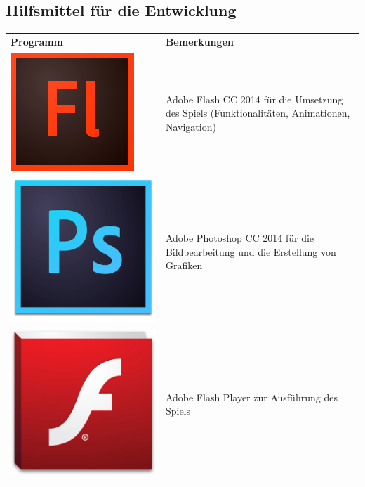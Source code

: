 \documentclass[a4paper, 11pt]{article} %
\begin{document}
\subsection{Hilfsmittel für die Entwicklung}
\begin{tabular}{lp{9cm}}
\textbf{Programm} & \textbf{Bemerkungen} \\ 
\includegraphics[scale=0.35]{images/flash.png} & 
\nohyphens{
Adobe Flash CC 2014 für die Umsetzung des Spiels
(Funktionalitäten, Animationen, Navigation)
} \\
\includegraphics[scale=0.5]{images/photoshop.png} & 
\nohyphens{
Adobe Photoshop CC 2014 für die Bildbearbeitung und die Erstellung von Grafiken
} \\
\includegraphics[scale=0.13]{images/flash_player.png} & 
\nohyphens{
Adobe Flash Player zur Ausführung des Spiels
} \\
\end{tabular} 
\end{document}
